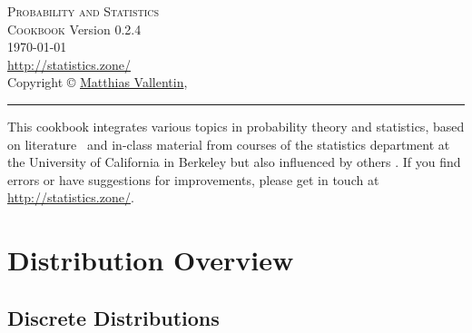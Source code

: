\documentclass[landscape]{article}
\newcommand{\version}{0.2.4}
\def\web{\url{http://statistics.zone/}}
\begin{document}
\thispagestyle{empty}
\begin{center}
  \vspace*{\fill}
  \textsc{\Huge Probability and Statistics\\[2ex] \huge Cookbook}
  \vfill
  \footnotesize{
    Version \version\\[1ex]
    \today\\[1ex]
    \web\\[1ex]
    Copyright \copyright{}
    \href{http://matthias.vallentin.net}{Matthias Vallentin}, \number\year\\
  }
\end{center}

\newpage

\thispagestyle{empty}
\begin{multicols*}{3}
  \tableofcontents
  \vfill
  \hrule
  \vspace{5pt}
  {\footnotesize This cookbook integrates various topics in probability theory
  and statistics, based on literature~\cite{Hoel72,Wasserman03,Shumway06}
  and in-class material from courses of the statistics department at the
  University of California in Berkeley but also influenced by others
  \cite{Steger01,Steger02}. If you find errors or have suggestions for
  improvements, please get in touch at \web.}
\end{multicols*}

\newpage

\section{Distribution Overview}

\subsection{Discrete Distributions}
\end{document}
